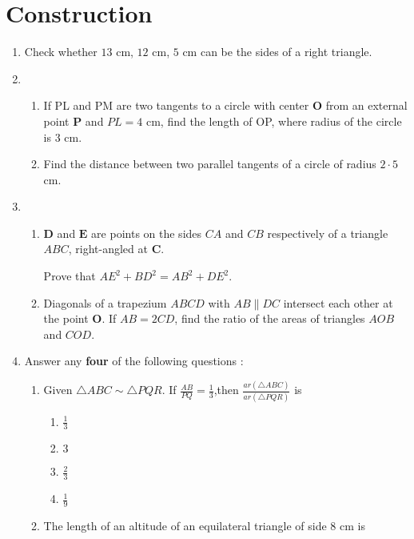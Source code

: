 \documentclass{article}
\let\vec\mathbf
\begin{document}
\section*{\centering Construction}
\begin{enumerate}
\item Check whether $13$ cm, $12$ cm, $5$ cm can be the sides of a right triangle.
\item \begin{enumerate}
    \item If  PL and PM are two tangents to a circle with center $\vec{O}$ from an external point $\vec{P}$ and $PL=4$ cm, find the length of OP, where radius of the circle is $3$ cm.
    \item Find the distance between two parallel tangents of a circle of radius $2\cdot5$ cm.
\end{enumerate}
    \item 
    \begin{enumerate}
    \item $\vec{D}$ and $\vec{E}$ are points on the sides $CA$ and $CB$ respectively of  a triangle $ABC$, right-angled at $\vec{C}$.
    
    Prove that $AE^2+BD^2=AB^2+DE^2$.
    
    \item Diagonals of a trapezium $ABCD$ with $AB\parallel DC$ intersect each other at the point $\vec{O}$. If $AB=2CD$, find the ratio of the areas of triangles $AOB$ and $COD$.
    \end{enumerate}

    \item Answer any \textbf{four} of the following questions :
      \begin{enumerate}[label=(\roman*)]
        \item Given $\triangle ABC \sim \triangle PQR$. If $\frac{AB}{PQ}=\frac{1}{3}$,then $\frac{ar(\triangle ABC)}{ar(\triangle PQR)}$ is 
        \begin{enumerate}[label=(\Alph*)]
            \item $\frac{1}{3}$
            \item $3$
            \item $\frac{2}{3}$
            \item $\frac{1}{9}$
        \end{enumerate}
        
        \item The length of an altitude of an equilateral triangle of side $8$ cm is
        

\end{enumerate}
\end{enumerate}
\end{document}
